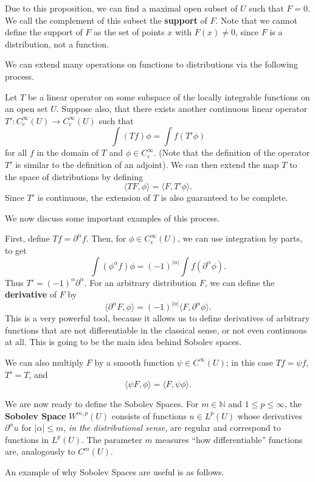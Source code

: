 \documentclass[12pt,letterpaper,reqno]{article}
\theoremstyle{plain}                              %
\theoremstyle{definition}                         %
\theoremstyle{remark}                             %
\numberwithin{equation}{section}
\newcommand{\N}{\mathbb{N}}                     %
\begin{document}
Due to this proposition, we can find a maximal open subset of $U$ such that $F=0$. We call the complement of this subset the \textbf{support} of $F$. Note that we cannot define the support of $F$ as the set of points $x$ with $F(x)\ne 0$, since $F$ is a distribution, not a function.

We can extend many operations on functions to distributions via the following process.

Let $T$ be a linear operator on some subspace of the locally integrable functions on an open set $U$. Suppose also, that there exists another continuous linear operator $T': C_c^\infty(U)\to C_c^\infty(U)$ such that
\[\int (Tf)\phi = \int f (T'\phi)\]
for all $f$ in the domain of $T$ and $\phi\in C_c^\infty$. (Note that the definition of the operator $T'$ is similar to the definition of an adjoint). We can then extend the map $T$ to the space of distributions by defining \[\langle TF,\phi\rangle=\langle F,T'\phi\rangle.\] Since $T'$ is continuous, the extension of $T$ is also guaranteed to be complete. 

We now discuss some important examples of this process.

First, define $Tf = \partial^\alpha f$. Then, for $\phi \in C_c^\infty(U)$, we can use integration by parts, to get \[\int (\phi^\alpha f)\phi = (-1)^{|\alpha|}\int f (\partial^\alpha \phi).\] Thus $T' = (-1)^\alpha \partial^\alpha$. For an arbitrary distribution $F$, we can define the \textbf{derivative} of $F$ by
\[\langle \partial^\alpha F,\phi\rangle = (-1)^{|\alpha|} \langle F,\partial^\alpha\phi\rangle.\]
This is a very powerful tool, because it allows us to define derivatives of arbitrary functions that are not differentiable in the classical sense, or not even continuous at all. This is going to be the main idea behind Sobolev spaces.

We can also multiply $F$ by a smooth function $\psi\in C^\infty(U)$; in this case $Tf=\psi f$, $T' = T$, and
\[\langle \psi F,\phi\rangle = \langle F, \psi\phi\rangle.\]

We are now ready to define the Sobolev Spaces. For $m\in \N$ and $1\le p \le \infty$, the \textbf{Sobolev Space} $W^{m,p}(U)$ consists of functions $u\in L^p(U)$ whose derivatives $\partial^\alpha u$ for $|\alpha|\le m$, \textit{in the distributional sense}, are regular and correspond to functions in $L^p(U)$. The parameter $m$ measures ``how differentiable'' functions are, analogously to $C^m(U)$. 

An example of why Sobolev Spaces are useful is as follows.
\end{document}
